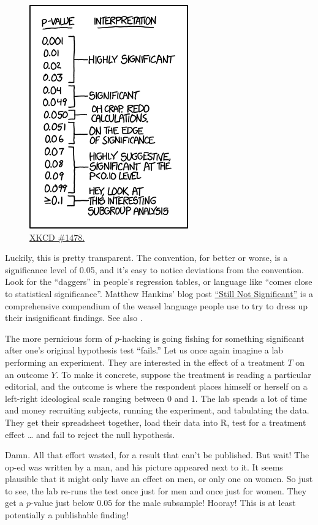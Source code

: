 \documentclass[12pt,oneside,openany]{book}
\begin{document}
\begin{figure}
\centering
\includegraphics{p_values.png}
\caption{\href{https://xkcd.com/1478/}{XKCD \#1478.}}
\end{figure}

Luckily, this is pretty transparent. The convention, for better or
worse, is a significance level of 0.05, and it's easy to notice
deviations from the convention. Look for the ``daggers'' in people's
regression tables, or language like ``comes close to statistical
significance''. Matthew Hankins' blog post
\href{https://mchankins.wordpress.com/2013/04/21/still-not-significant-2/}{``Still
Not Significant''} is a comprehensive compendium of the weasel language
people use to try to dress up their insignificant findings. See also
\citet{pritschet2016marginally}.

The more pernicious form of \(p\)-hacking is going fishing for something
significant after one's original hypothesis test ``fails.'' Let us once
again imagine a lab performing an experiment. They are interested in the
effect of a treatment \(T\) on an outcome \(Y\). To make it concrete,
suppose the treatment is reading a particular editorial, and the outcome
is where the respondent places himself or herself on a left-right
ideological scale ranging between 0 and 1. The lab spends a lot of time
and money recruiting subjects, running the experiment, and tabulating
the data. They get their spreadsheet together, load their data into R,
test for a treatment effect \ldots{} and fail to reject the null
hypothesis.

Damn. All that effort wasted, for a result that can't be published. But
wait! The op-ed was written by a man, and his picture appeared next to
it. It seems plausible that it might only have an effect on men, or only
one on women. So just to see, the lab re-runs the test once just for men
and once just for women. They get a \(p\)-value just below \(0.05\) for
the male subsample! Hooray! This is at least potentially a publishable
finding!
\end{document}
